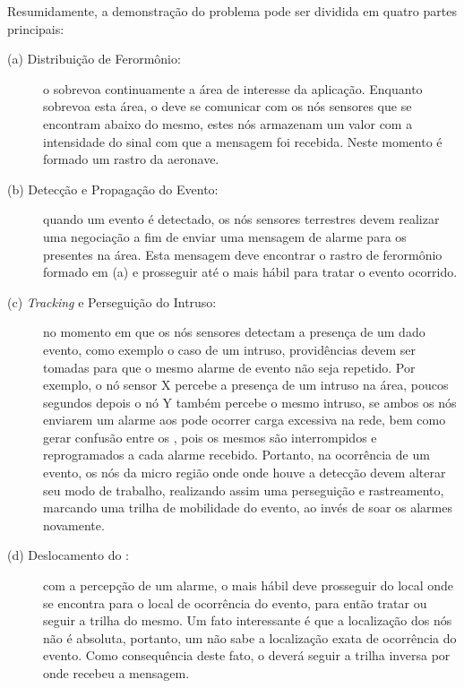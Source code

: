 Resumidamente, a demonstração do problema pode ser dividida em quatro partes principais:

\begin{description}

	\item[ (a) Distribuição de Ferormônio: ] o \vant sobrevoa continuamente a área de interesse da aplicação. Enquanto sobrevoa esta área, o \vant deve se comunicar com os nós sensores que se encontram abaixo do mesmo, estes nós armazenam um valor com a intensidade do sinal com que a mensagem foi recebida. Neste momento é formado um rastro da aeronave.
	
	\item[ (b) Detecção e Propagação do Evento:] quando um evento é detectado, os nós sensores terrestres devem realizar uma negociação a fim de enviar uma mensagem de alarme para os \vants presentes na área. Esta mensagem deve encontrar o rastro de ferormônio formado em (a) e prosseguir até o \vant mais hábil para tratar o evento ocorrido.

	\item[ (c) \emph{Tracking} e Perseguição do Intruso: ] no momento em que os nós sensores detectam a presença de um dado evento, como exemplo o caso de um intruso, providências devem ser tomadas para que o mesmo alarme de evento não seja repetido. Por exemplo, o nó sensor X percebe a presença de um intruso na área, poucos segundos depois o nó Y também percebe o mesmo intruso, se ambos os nós enviarem um alarme aos \vants pode ocorrer carga excessiva na rede, bem como gerar confusão entre os \vants, pois os mesmos são interrompidos e reprogramados a cada alarme recebido. Portanto, na ocorrência de um evento, os nós da micro região onde onde houve a detecção devem alterar seu modo de trabalho, realizando assim uma perseguição e rastreamento, marcando uma trilha de mobilidade do evento, ao invés de soar os alarmes novamente.

	\item[ (d) Deslocamento do \vant: ] com a percepção de um alarme, o \vant mais hábil deve prosseguir do local onde se encontra para o local de ocorrência do evento, para então tratar ou seguir a trilha do mesmo. Um fato interessante é que a localização dos nós não é absoluta, portanto, um \vant não sabe a localização exata de ocorrência do evento. Como consequência deste fato, o \vant deverá seguir a trilha inversa por onde recebeu a mensagem.

\end{description}

